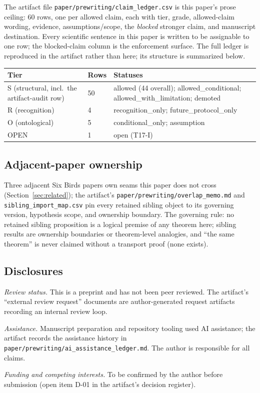 \documentclass[11pt]{article}
\theoremstyle{definition}
\begin{document}
The artifact file \texttt{paper/prewriting/claim\_ledger.csv} is this paper's
prose ceiling: 60 rows, one per allowed claim, each with tier, grade,
allowed-claim wording, evidence, assumptions/scope, the \emph{blocked}
stronger claim, and manuscript destination. Every scientific sentence in this
paper is written to be assignable to one row; the blocked-claim column is the
enforcement surface. The full ledger is reproduced in the artifact rather
than here; its structure is summarized below.

\begin{center}\small
\begin{tabular}{lll}
\toprule
Tier & Rows & Statuses \\
\midrule
S (structural, incl.\ the artifact-audit row) & 50 & allowed (44 overall); allowed\_conditional; allowed\_with\_limitation; demoted \\
R (recognition) & 4 & recognition\_only; future\_protocol\_only \\
O (ontological) & 5 & conditional\_only; assumption \\
OPEN & 1 & open (T17-I) \\
\bottomrule
\end{tabular}
\end{center}

\subsection{Adjacent-paper ownership}

Three adjacent Six Birds papers own seams this paper does not cross
(Section~\ref{sec:related}); the artifact's
\texttt{paper/prewriting/overlap\_memo.md} and
\texttt{sibling\_import\_map.csv} pin every retained sibling object to its
governing version, hypothesis scope, and ownership boundary. The governing
rule: no retained sibling proposition is a logical premise of any theorem
here; sibling results are ownership boundaries or theorem-level analogies,
and ``the same theorem'' is never claimed without a transport proof (none
exists).

\subsection{Disclosures}

\emph{Review status.} This is a preprint and has not been peer reviewed. The
artifact's ``external review request'' documents are author-generated request
artifacts recording an internal review loop.

\emph{Assistance.} Manuscript preparation and repository tooling used AI
assistance; the artifact records the assistance history in
\texttt{paper/prewriting/ai\_assistance\_ledger.md}. The author is
responsible for all claims.

\emph{Funding and competing interests.} To be confirmed by the author before
submission (open item D-01 in the artifact's decision register).
 
\clearpage


\end{document}
